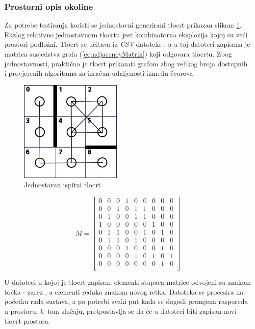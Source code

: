 \documentclass[times, utf8, diplomski, numeric]{fer}
\begin{document}
\subsubsection{Prostorni opis okoline}
Za potrebe testiranja koristi se jednostavni generirani tlocrt prikazan slikom
\ref{fig:layout}. Razlog relativno jednostavnom tlocrtu jest kombinatorna
eksplozija kojoj su veći prostori podložni. Tlocrt se učitava iz \emph{CSV}
datoteke , a u toj datoteci zapisana je matrica
susjedstva grafa (\ref{eq:adjacencyMatrix}) koji odgovara tlocrtu. Zbog
jednostavnosti, praktično je tlocrt prikazati grafom zbog velikog broja
dostupnih i provjerenih algoritama za izračun udaljenosti između čvorova

\begin{figure}[!htb]
	\centering
	\includegraphics[width=5cm]{images/3x3grid.png}
	\caption{Jednostavan ispitni tlocrt}
	\label{fig:layout}
\end{figure}

\begin{equation}
	\label{eq:adjacencyMatrix}
	M = 
	\begin{bmatrix}
		0 & 0 & 0 & 1 & 0 & 0 & 0 & 0 & 0\\
		0 & 0 & 1 & 0 & 1 & 1 & 0 & 0 & 0\\
		0 & 1 & 0 & 0 & 1 & 1 & 0 & 0 & 0\\
		1 & 0 & 0 & 0 & 0 & 0 & 1 & 0 & 0\\
		0 & 1 & 1 & 0 & 0 & 1 & 0 & 1 & 0\\
		0 & 1 & 1 & 0 & 1 & 0 & 0 & 0 & 0\\
		0 & 0 & 0 & 1 & 0 & 0 & 0 & 1 & 0\\
		0 & 0 & 0 & 0 & 1 & 0 & 1 & 0 & 1\\
		0 & 0 & 0 & 0 & 0 & 0 & 0 & 1 & 0\\
	\end{bmatrix}
\end{equation}

U datoteci u kojoj je tlocrt zapisan, elementi stupaca matrice odvojeni su
znakom točka - zarez , a elementi redaka znakom novog retka.
Datoteka se procesira na početku rada sustava, a po potrebi svaki put kada se
dogodi promjena rasporeda u prostoru. U tom slučaju, pretpostavlja se da će u
datoteci biti zapisan novi tlocrt prostora.
\end{document}
